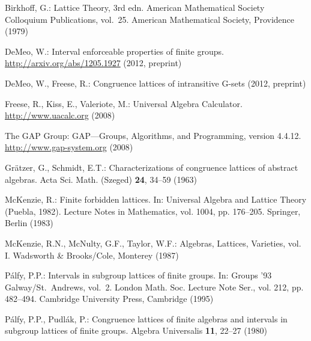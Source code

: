 \documentclass{au}
\numberwithin{equation}{section}
\theoremstyle{plain}
\theoremstyle{definition}
\newcommand{\<}{\ensuremath{\langle}}
\renewcommand{\>}{\ensuremath{\rangle}}
\begin{document}
% 
\begin{thebibliography}{99}

Birkhoff, G.: Lattice Theory, 3rd edn. American Mathematical Society Colloquium Publications, vol.~25. American Mathematical Society, Providence (1979)

DeMeo, W.: Interval enforceable properties of finite groups. \url{http://arxiv.org/abs/1205.1927} (2012, preprint)

DeMeo, W., Freese, R.: Congruence lattices of intransitive {G}-sets (2012, preprint)

Freese, R., Kiss, E., Valeriote, M.: Universal {A}lgebra {C}alculator. \url{http://www.uacalc.org} (2008)

The GAP Group: {GAP---Groups, Algorithms, and Programming, version 4.4.12}.
\newblock \url{http://www.gap-system.org} (2008)

Gr{\"a}tzer, G., Schmidt, E.T.: Characterizations of congruence lattices of
  abstract algebras.
\newblock Acta Sci. Math. (Szeged) \textbf{24}, 34--59 (1963)

McKenzie, R.: Finite forbidden lattices.
\newblock In: Universal Algebra and Lattice Theory ({P}uebla, 1982).
  Lecture Notes in Mathematics, vol. 1004, pp. 176--205. Springer, Berlin
  (1983)

McKenzie, R.N., McNulty, G.F., Taylor, W.F.: Algebras, Lattices, Varieties,
  {v}ol. {I}.
\newblock Wadsworth \& Brooks/Cole, Monterey (1987)

P{\'a}lfy, P.P.: Intervals in subgroup lattices of finite groups.
\newblock In: Groups '93 {G}alway/{S}t.\ {A}ndrews, {v}ol.\ 2. London
  Math. Soc. Lecture Note Ser., vol. 212, pp. 482--494. Cambridge University Press, Cambridge (1995)

P{\'a}lfy, P.P., Pudl{\'a}k, P.: Congruence lattices of finite algebras and
  intervals in subgroup lattices of finite groups.
\newblock Algebra Universalis \textbf{11}, 22--27 (1980)

\end{thebibliography}
\end{document}
